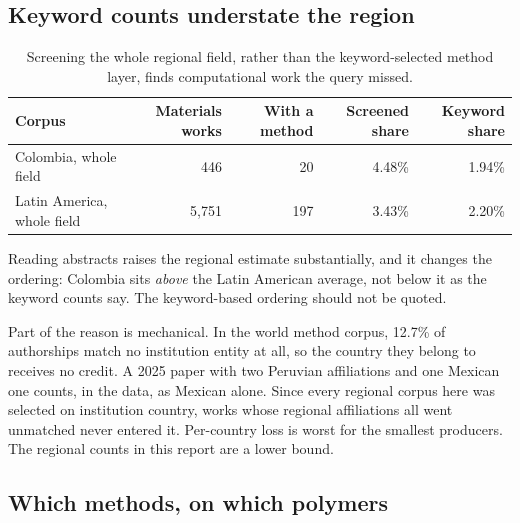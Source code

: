 \documentclass[11pt,a4paper]{article}
\begin{document}
\subsection{Keyword counts understate the region}

\begin{table}[htbp]
\centering
\caption{Screening the whole regional field, rather than the keyword-selected method layer,
finds computational work the query missed.}
\label{tab:regional}
\small
\begin{tabular}{lrrrr}
\toprule
Corpus & Materials works & With a method & Screened share & Keyword share \\
\midrule
Colombia, whole field & 446 & 20 & 4.48\% & 1.94\% \\
Latin America, whole field & 5,751 & 197 & 3.43\% & 2.20\% \\
\bottomrule
\end{tabular}
\end{table}

Reading abstracts raises the regional estimate substantially, and it changes the ordering:
Colombia sits \emph{above} the Latin American average, not below it as the keyword counts
say. The keyword-based ordering should not be quoted.


Part of the reason is mechanical. In the world method corpus,
12.7\% of authorships match no institution entity
at all, so the country they belong to receives no credit. A 2025 paper with two Peruvian
affiliations and one Mexican one counts, in the data, as Mexican alone. Since every regional
corpus here was selected on institution country, works whose regional affiliations all went
unmatched never entered it. Per-country loss is worst for the smallest producers. The
regional counts in this report are a lower bound.


\subsection{Which methods, on which polymers}
\end{document}
